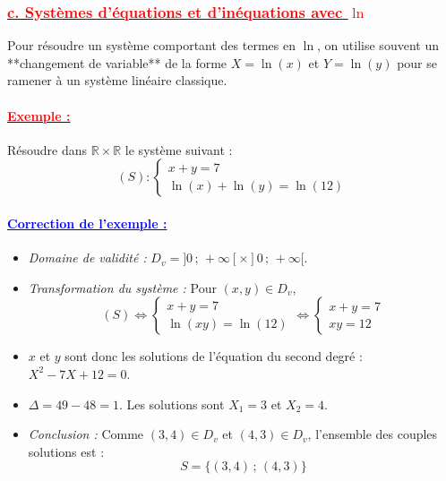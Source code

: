 \documentclass[12pt,a4paper]{article}
\newcounter{exemple}
\begin{document}
\vspace{0.5cm}

\subsubsection*{\underline{\textbf{\textcolor{red}{c. Systèmes d'équations et d'inéquations avec $\ln$}}}}

Pour résoudre un système comportant des termes en $\ln$, on utilise souvent un **changement de variable** de la forme $X = \ln(x)$ et $Y = \ln(y)$ pour se ramener à un système linéaire classique.

\paragraph{\underline{\textbf{\textcolor{red}{Exemple :}}}}
Résoudre dans $\mathbb{R} \times \mathbb{R}$ le système suivant :
\[
(S) : \begin{cases}
x + y = 7 \\
\ln(x) + \ln(y) = \ln(12)
\end{cases}
\]

\paragraph{\underline{\textbf{\textcolor{blue}{Correction de l'exemple :}}}}
\begin{itemize}
    \item \textit{Domaine de validité :} $D_v = ]0\,;\,+\infty[ \times ]0\,;\,+\infty[$.
    \item \textit{Transformation du système :} Pour $(x, y) \in D_v$,
    \[
    (S) \iff \begin{cases}
    x + y = 7 \\
    \ln(xy) = \ln(12)
    \end{cases} \iff \begin{cases}
    x + y = 7 \\
    xy = 12
    \end{cases}
    \]
    \item $x$ et $y$ sont donc les solutions de l'équation du second degré : $X^2 - 7X + 12 = 0$.
    \item $\Delta = 49 - 48 = 1$. Les solutions sont $X_1 = 3$ et $X_2 = 4$.
    \item \textit{Conclusion :} Comme $(3,4) \in D_v$ et $(4,3) \in D_v$, l'ensemble des couples solutions est :
    \[
    S = \{(3, 4) \,;\, (4, 3)\}
    \]
\end{itemize}
\end{document}
